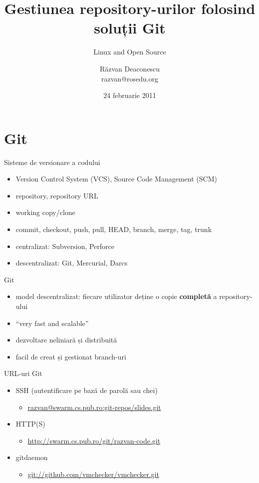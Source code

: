 \documentclass{simple}
\title[Git Repositories]{Gestiunea repository-urilor folosind soluții Git}
\subtitle{Linux and Open Source}
\author[Răzvan Deaconescu]{Răzvan Deaconescu\\
	razvan@rosedu.org}
\date{24 februarie 2011}
\begin{document}
\frame{\titlepage}

\frame{\tableofcontents}

\section{Git}

\begin{frame}{Sisteme de versionare a codului}
	\begin{itemize}		%
		\item Version Control System (VCS), Source Code Management (SCM)
		\item repository, repository URL
        \item working copy/clone
        \item commit, checkout, push, pull, HEAD, branch, merge, tag, trunk
        \item centralizat: Subversion, Perforce
        \item descentralizat: Git, Mercurial, Darcs
	\end{itemize}
\end{frame}

\begin{frame}{Git}
	\begin{itemize}
		\item model descentralizat: fiecare utilizator deține o copie
        \textbf{completă} a repository-ului
		\item ``very fast and scalable''
        \item dezvoltare neliniară și distribuită
        \item facil de creat și gestionat branch-uri
	\end{itemize}
\end{frame}

\begin{frame}{URL-uri Git}
	\begin{itemize}
		\item SSH (autentificare pe bază de parolă sau chei)
          \begin{itemize}
            \item \url{razvan@swarm.cs.pub.ro:git-repos/slides.git}
          \end{itemize}
		\item HTTP(S)
          \begin{itemize}
            \item \url{http://swarm.cs.pub.ro/git/razvan-code.git}
          \end{itemize}
        \item gitdaemon
          \begin{itemize}
            \item \url{git://github.com/vmchecker/vmchecker.git}
          \end{itemize}
	\end{itemize}
\end{frame}
\end{document}

